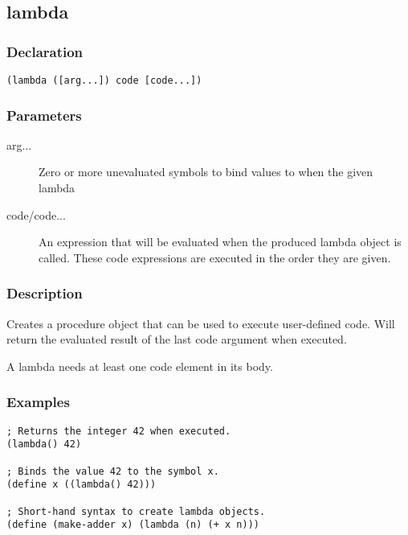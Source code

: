 \subsection{lambda}
\label{builtins/lambda}

\subsubsection*{Declaration}
\begin{lstlisting}
(lambda ([arg...]) code [code...])
\end{lstlisting}

\subsubsection*{Parameters}
\begin{description}
	\item[arg...] Zero or more unevaluated symbols to bind values to when the given lambda
	\item[code/code...] An expression that will be evaluated when the produced lambda object is called. These code expressions are executed in the order they are given.
\end{description}

\subsubsection*{Description}
Creates a procedure object that can be used to execute user-defined code. Will return the evaluated result of the last code argument when executed.

A lambda needs at least one code element in its body.

\subsubsection{Examples}
\begin{lstlisting}
; Returns the integer 42 when executed.
(lambda() 42)

; Binds the value 42 to the symbol x.
(define x ((lambda() 42)))

; Short-hand syntax to create lambda objects.
(define (make-adder x) (lambda (n) (+ x n)))
\end{lstlisting}
